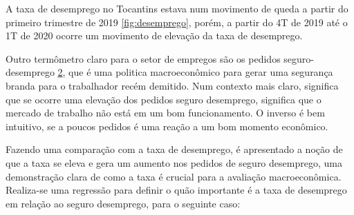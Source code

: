 \begin{figure}[!h]
\begin{subfigure}{\linewidth}
		\label{fig:seguro}
	\end{subfigure}
\end{figure}

\par A taxa de desemprego no Tocantins estava num movimento de queda a partir do primeiro trimestre de 2019 \ref{fig:desemprego}, porém, a partir do 4T de 2019 até o 1T de 2020 ocorre um movimento de elevação da taxa de desemprego.



\par Outro termômetro claro para o setor de empregos são os pedidos seguro-desemprego \ref{fig:seguro}, que é uma politica macroeconômico para gerar uma segurança branda para o trabalhador recém demitido. Num contexto mais claro, significa que se ocorre uma elevação dos pedidos seguro desemprego, significa que o mercado de trabalho não está em um bom funcionamento. O inverso é bem intuitivo, se a poucos pedidos é uma reação a um bom momento econômico. 

\par Fazendo uma comparação com a taxa de desemprego, é apresentado a noção de que a taxa se eleva e gera um aumento nos pedidos de seguro desemprego, uma demonstração clara de como a taxa é crucial para a avaliação macroeconômica. Realiza-se uma regressão para definir o quão importante é a taxa de desemprego em relação ao seguro desemprego, para o seguinte caso:

